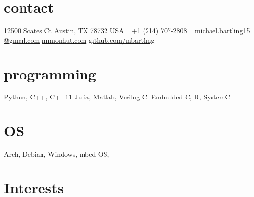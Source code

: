 \documentclass[]{friggeri-cv} %
\begin{document}

\begin{aside} %
\section{contact}
12500 Scates Ct
Austin, TX 78732
USA
~
+1 (214) 707-2808
~
\href{mailto:michael.bartling15@gmail.com}{michael.bartling15
@gmail.com}
\href{http://www.minionhut.com}{minionhut.com}
\href{http://github.com/mbartling}{github.com/mbartling}
\section{programming}
{%
Python, C++, C++11
Julia, Matlab, Verilog
C, Embedded C, R, SystemC}
\section{OS}
Arch, Debian,
Windows, mbed OS,
\end{aside}

\section{Interests}
\end{document}
